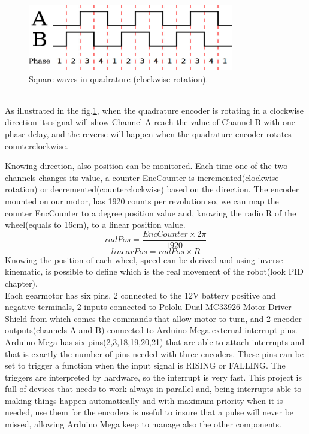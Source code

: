 \begin{figure}[h]
	\centering
	\includegraphics[width=0.8\textwidth]{encoder}
	\caption{Square waves in quadrature (clockwise rotation).}
	\label{fig:quad_enc_phase}
\end{figure}
\\
As illustrated in the fig.\ref{fig:quad_enc_phase}, when the quadrature encoder is rotating in a clockwise direction its signal will show Channel A reach the value of Channel B with one phase delay, and the reverse will happen when the quadrature encoder rotates counterclockwise.

Knowing direction, also position can be monitored. Each time one of the two channels changes its value, a counter EncCounter is incremented(clockwise rotation) or decremented(counterclockwise) based on the direction. The encoder mounted on our motor, has 1920 counts per revolution so, we can map the counter EncCounter to a degree position value and, knowing the radio R of the wheel(equals to 16cm), to a linear position value.
$$radPos= \frac{EncCounter\times2\pi}{1920}$$
$$linearPos= radPos\times R$$
Knowing the position of each wheel, speed can be derived and using inverse kinematic, is possible to define which is the real movement of the robot(look PID chapter).\\

Each gearmotor has six pins, 2 connected to the 12V battery positive and negative terminals, 2 inputs connected to Pololu Dual MC33926 Motor Driver Shield from which comes the commands  that allow motor to turn, and 2 encoder outputs(channels A and B)  connected to Arduino Mega external interrupt pins. Arduino Mega has six pins(2,3,18,19,20,21) that are able to attach interrupts and that is exactly the number of pins needed with three encoders. These pins can be set to trigger a function when the input signal is RISING or FALLING. The triggers are interpreted by hardware, so the interrupt is very fast. 
This project is full of devices that needs to work always in parallel and, being interrupts able to making things happen automatically and with maximum priority when it is needed, use them for the encoders is useful to insure that a pulse will never be missed, allowing Arduino Mega keep to manage also the other components.

